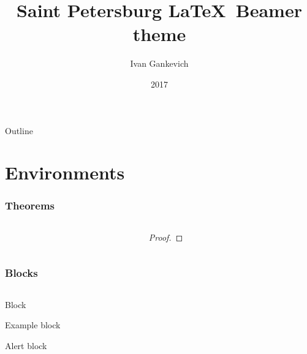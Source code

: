 \documentclass[aspectratio=169]{beamer}
\title{Saint Petersburg \LaTeX~Beamer theme}
\author{Ivan Gankevich}
\institute{Saint Petersburg State University}
\date{2017}
\begin{document}
\frame{\titlepage}

\begin{frame}{Outline}
	\tableofcontents
\end{frame}

\section{Environments}

\frame{\sectionpage}

\begin{frame}
	\frametitle{Theorems}
    \begin{columns}[T]
        \begin{column}{0.45\textwidth}
			\begin{example}\end{example}
			\begin{examples}\end{examples}
			\begin{definition}\end{definition}
			\begin{definitions}\end{definitions}
        \end{column}
        \begin{column}{0.45\textwidth}
			\begin{theorem}[Fermat]\end{theorem}
			\begin{proof}[Proof\nopunct]\end{proof}
			\begin{corollary}\end{corollary}
			\begin{lemma}\end{lemma}
			\begin{fact}\end{fact}
        \end{column}
	\end{columns}
\end{frame}

\begin{frame}
    \frametitle{Blocks}
    \begin{columns}[T]
        \begin{column}{0.45\textwidth}
            \begin{block}{Block}\end{block}
            \begin{exampleblock}{Example block}\end{exampleblock}
            \begin{alertblock}{Alert block}\end{alertblock}
        \end{column}
        \begin{column}{0.45\textwidth}
        \end{column}
    \end{columns}
\end{frame}
\end{document}
